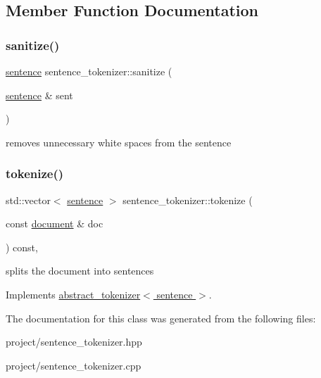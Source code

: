 \subsection{Member Function Documentation}
\mbox{\label{classsentence__tokenizer_a9e0f69df43e0a28ff849628274bc7990}} 
\subsubsection{\texorpdfstring{sanitize()}{sanitize()}}
{\footnotesize\ttfamily \hyperlink{classsentence}{sentence} sentence\+\_\+tokenizer\+::sanitize (\begin{DoxyParamCaption}\item[{\hyperlink{classsentence}{sentence} \&}]{sent }\end{DoxyParamCaption})\hspace{0.3cm}{\ttfamily [static]}}

removes unnecessary white spaces from the sentence \mbox{\label{classsentence__tokenizer_a7d8d0af4624c8bc7d37dd85af99f5695}} 
\subsubsection{\texorpdfstring{tokenize()}{tokenize()}}
{\footnotesize\ttfamily std\+::vector$<$ \hyperlink{classsentence}{sentence} $>$ sentence\+\_\+tokenizer\+::tokenize (\begin{DoxyParamCaption}\item[{const \hyperlink{classdocument}{document} \&}]{doc }\end{DoxyParamCaption}) const\hspace{0.3cm}{\ttfamily [override]}, {\ttfamily [virtual]}}

splits the document into sentences 

Implements \hyperlink{classabstract__tokenizer_a5948210e787d9ed3681800b4e3926701}{abstract\+\_\+tokenizer$<$ sentence $>$}.



The documentation for this class was generated from the following files\+:\begin{DoxyCompactItemize}
\item 
project/sentence\+\_\+tokenizer.\+hpp\item 
project/sentence\+\_\+tokenizer.\+cpp\end{DoxyCompactItemize}
